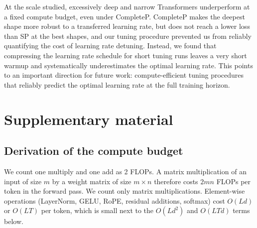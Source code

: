 \documentclass[10pt,twocolumn,a4paper]{article}
\begin{document}
At the scale studied, excessively deep and narrow Transformers underperform at a fixed compute budget, even under CompleteP. CompleteP makes the deepest shape more robust to a transferred learning rate, but does not reach a lower loss than SP at the best shapes, and our tuning procedure prevented us from reliably quantifying the cost of learning rate detuning. Instead, we found that compressing the learning rate schedule for short tuning runs leaves a very short warmup and systematically underestimates the optimal learning rate. This points to an important direction for future work: compute-efficient tuning procedures that reliably predict the optimal learning rate at the full training horizon.



\balance
\setlength{\bibsep}{2pt plus 1pt}  %




\clearpage

\onecolumn
\appendix

\section{Supplementary material}



\subsection{Derivation of the compute budget}\label{app:flops}

We count one multiply and one add as 2 FLOPs. A matrix multiplication of an input of size $m$ by a weight matrix of size $m \times n$ therefore costs $2mn$ FLOPs per token in the forward pass. We count only matrix multiplications. Element-wise operations (LayerNorm, GELU, RoPE, residual additions, softmax) cost $O(Ld)$ or $O(LT)$ per token, which is small next to the $O(Ld^2)$ and $O(LTd)$ terms below.
\end{document}
